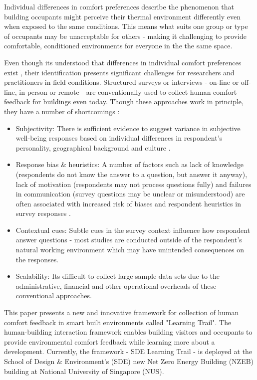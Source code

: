 

Individual differences in comfort preferences describe the phenomenon that building occupants might perceive their thermal environment differently even when exposed to the same conditions. This means what suits one group or type of occupants may be unacceptable for others - making it challenging to provide comfortable, conditioned environments for everyone in the the same space.

Even though its understood that differences in individual comfort preferences exist \cite{WANG2018181}, their identification presents significant challenges for researchers and practitioners in field conditions. Structured surveys or interviews - on-line or off-line, in person or remote - are conventionally used to collect human comfort feedback for buildings even today. Though these approaches work in principle, they have a number of shortcomings \cite{organisationforeconomicco-operationanddevelopment(oecd)_2013}:  

\begin{itemize}
  \item Subjectivity: There is sufficient evidence to suggest variance in subjective well-being responses based on individual differences in respondent's personality, geographical background and culture \cite{doi:10.1146/annurev.psych.54.101601.145056}.
  \item Response bias \& heuristics: A number of factors such as lack of knowledge (respondents do not know the answer to a question, but answer it anyway), lack of motivation (respondents may not process questions fully) and failures in communication (survey questions may be unclear or misunderstood) are often associated with increased risk of biases and respondent heuristics in survey responses \cite{bradburn2004asking}.
  \item Contextual cues: Subtle cues in the survey context influence how respondent answer questions \cite{krosnick1997seymour} - most studies are conducted outside of the respondent's natural working environment which may have unintended consequences on the responses. 
  \item Scalability: Its difficult to collect large sample data sets due to the administrative, financial and other operational overheads of these conventional approaches.
\end{itemize}


This paper presents a new and innovative framework for collection of human comfort feedback in smart built environments called "Learning Trail". The human-building interaction framework enables building visitors and occupants to provide environmental comfort feedback while learning more about a development. Currently, the framework - SDE Learning Trail - is deployed at the School of Design \& Environment's (SDE) new Net Zero Energy Building (NZEB) building at National University of Singapore (NUS). %

